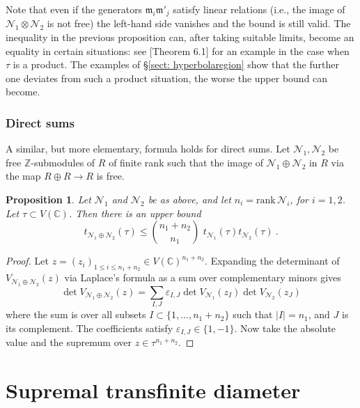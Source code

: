 \documentclass[a4paper,10pt]{amsart}
\newtheorem{prop}[thm]{Proposition}
\theoremstyle{definition}
\theoremstyle{remark}
\numberwithin{equation}{section}
\newcommand{\Z}{\mathbb Z}
\newcommand{\C}{\mathbb C}
\newcommand{\m}{\mathfrak{m}}
\newcommand{\rank}{\mathrm{rank}}
\newcommand{\0}{\color{blue}{\mathsf{0}}}
\begin{document}
  Note that even if the generators $\m_i \m'_j$ satisfy linear relations (i.e., the image of $\mathcal{N}_1\otimes \mathcal{N}_2$ is not free) the  left-hand side vanishes and the bound is still valid.
  The inequality in the previous proposition can, after taking suitable limits, become an equality in certain situations: see \cite{BrVdM}[Theorem 6.1] for an example in the case when $\tau$ is a product. The examples of  \S\ref{sect: hyperbolaregion}  show that the further one deviates  from such a  product situation, the worse the upper bound can become. 
 
 
  \subsubsection{Direct sums}
   A similar, but more elementary, formula holds for direct sums. 
   Let $\mathcal{N}_1, \mathcal{N}_2$ be free $\Z$-submodules of $R$ of finite rank such that the image of  $\mathcal{N}_1 \oplus \mathcal{N}_2$ in $R$ via the map $R\oplus R \rightarrow R$ is free.
   
   \begin{prop}   \label{prop: upperboundtaudirectsum}
  Let  $\mathcal{N}_1$ and $\mathcal{N}_2$ be as  above, and let $n_i = \rank\, \mathcal{N}_i$, for $i=1, 2$.  Let
   $\tau \subset  V(\C)$. Then there is an upper bound 
  \[ 
  t_{\mathcal{N}_1 \oplus \mathcal{N}_2} (\tau ) \leq    \binom{n_1+n_2}{n_1}  \, \,   t_{\mathcal{N}_1}(\tau)     t_{\mathcal{N}_2}(\tau)    \  .  
  \]
    \end{prop} 
  
  \begin{proof} Let $z =(z_i)_{1\leq i \leq n_1+n_2} \in V(\C)^{n_1+n_2}$.
  Expanding  the determinant of $V_{\mathcal{N}_1 \oplus \mathcal{N}_2}(z)$  via Laplace's formula  as  a sum over  complementary minors gives
     \[ \det  V_{\mathcal{N}_1 \oplus \mathcal{N}_2} (z)  = \sum_{I,J} \varepsilon_{I,J}  \det V_{\mathcal{N}_1} (z_I)  \det V_{\mathcal{N}_2} (z_J)     
    \] 
    where the sum is over all subsets $I \subset \{1,\ldots, n_1+n_2\}$ such that $|I|=n_1$,  and $J$ is its complement.   The coefficients satisfy $\varepsilon_{I,J} \in \{1,-1\}$.  
    Now take the absolute value and the supremum over  $z\in \tau^{n_1+n_2}$.  \end{proof} 
 
  
  
  
  \section{Supremal transfinite diameter} \label{sect: Suptransfinite}
  
\end{document}
